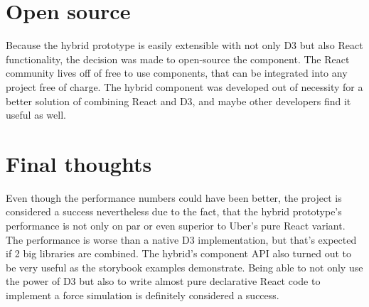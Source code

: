 \section{Open source}

Because the hybrid prototype is easily extensible with not only D3 but also React functionality, the decision was made to open-source the component. The React community lives off of free to use components, that can be integrated into any project free of charge. The hybrid component was developed out of necessity for a better solution of combining React and D3, and maybe other developers find it useful as well.

\section{Final thoughts}

Even though the performance numbers could have been better, the project is considered a success nevertheless due to the fact, that the hybrid prototype's performance is not only on par or even superior to Uber's pure React variant. The performance is worse than a native D3 implementation, but that's expected if 2 big libraries are combined. The hybrid's component API also turned out to be very useful as the storybook examples demonstrate. Being able to not only use the power of D3 but also to write almost pure declarative React code to implement a force simulation is definitely considered a success.








